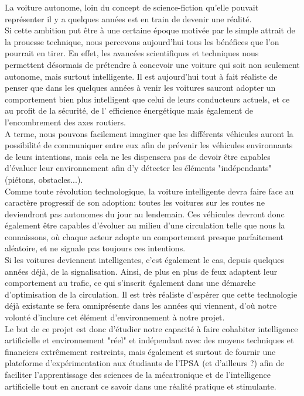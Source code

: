 La voiture autonome, loin du concept de science-fiction qu'elle pouvait représenter il y a quelques années est en train de devenir une réalité.\\

Si cette ambition put être à une certaine époque motivée par le simple attrait de la prouesse technique, nous percevons aujourd'hui tous les bénéfices que l'on pourrait en tirer.
En effet, les avancées scientifiques et techniques nous permettent désormais de prétendre à concevoir une voiture qui soit non seulement autonome, mais surtout intelligente. Il est aujourd'hui tout à fait réaliste de penser que dans les quelques années à venir les voitures sauront adopter un comportement bien plus intelligent que celui de leurs conducteurs actuels, et ce au profit de la sécurité, de l' efficience énergétique mais également de l'encombrement des axes routiers.\\

A terme, nous pouvons facilement imaginer que les différents véhicules auront la possibilité de communiquer entre eux afin de prévenir les véhicules environnants de leurs intentions, mais cela ne les dispensera pas de devoir être capables d'évaluer leur environnement afin d'y détecter les éléments "indépendants" (piétons, obstacles...). \\

Comme toute révolution technologique, la voiture intelligente devra faire face au caractère progressif de son adoption: toutes les voitures sur les routes ne deviendront pas autonomes du jour au lendemain. Ces véhicules devront donc également être capables d'évoluer au milieu d'une circulation telle que nous la connaissons, où chaque acteur adopte un comportement presque parfaitement aléatoire, et ne signale pas toujours ces intentions.\\

Si les voitures deviennent intelligentes, c'est également le cas, depuis quelques années déjà, de la signalisation. Ainsi, de plus en plus de feux adaptent leur comportement au trafic, ce qui s'inscrit également dans une démarche d'optimisation de la circulation. Il est très réaliste d'espérer que cette technologie déjà existante se fera omniprésente dans les années qui viennent, d'où notre volonté d'inclure cet élément d’environnement à notre projet.\\

Le but de ce projet est donc d'étudier notre capacité à faire cohabiter intelligence artificielle et environnement "réel" et indépendant avec des moyens techniques et financiers extrêmement restreints, mais également et surtout de fournir une plateforme d'expérimentation aux étudiants de l'IPSA (et d'ailleurs ?) afin de faciliter l'apprentissage des sciences de la mécatronique et de l’intelligence artificielle tout en ancrant ce savoir dans une réalité pratique et stimulante.